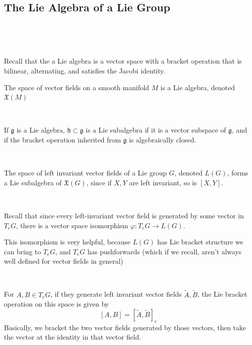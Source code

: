 \documentclass{article}
\begin{document}
\subsection{The Lie Algebra of a Lie Group}
\

\begin{remark}
  \

  Recall that the a Lie algebra is a vector space with a bracket operation that is bilinear, alternating, and satisfies the Jacobi identity.

  The space of vector fields on a smooth manifold $M$ is a Lie algebra, denoted $\mathfrak{X}(M)$
\end{remark}

\begin{definition}
  \

  If $\mathfrak{g}$ is a Lie algebra, $\mathfrak{h} \subset \mathfrak{g}$ is a Lie subalgebra if it is a vector subspace of $\mathfrak{g}$, and if the bracket operation inherited from $\mathfrak{g}$ is algebraically closed.
\end{definition}

\begin{example}
  \

  The space of left invariant vector fields of a Lie group $G$, denoted $L(G)$, forms a Lie subalgebra of $\mathfrak{X}(G)$, since if $X,Y$ are left invariant, so is $[X,Y]$.
\end{example}

\begin{remark}
  \

  Recall that since every left-invariant vector field is generated by some vector in $T_eG$, there is a vector space isomorphism $\varphi: T_eG \to L(G)$.

  This isomorphism is very helpful, because $L(G)$ has Lie bracket structure we can bring to $T_eG$, and $T_eG$ has pushforwards (which if we recall, aren't always well defined for vector fields in general)
\end{remark}

\begin{definition}
  \

  For $A,B \in T_eG$, if they generate left invariant vector fields $\tilde{A}, \tilde{B}$, the Lie bracket operation on this space is given by $$[A,B] = [\tilde{A}, \tilde{B}]_e$$Basically, we bracket the two vector fields generated by those vectors, then take the vector at the identity in that vector field.
\end{definition}
\end{document}
